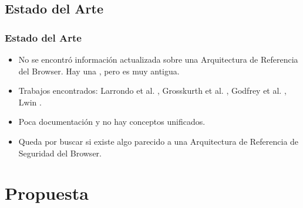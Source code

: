 \documentclass[serif,9pt]{beamer}
\begin{document}
\subsection{Estado del Arte}
\begin{frame}
	\frametitle{Estado del Arte}
	\begin{itemize}
		\item No se encontr\'o informaci\'on actualizada sobre una Arquitectura de Referencia del Browser. Hay una \cite{preprint-grosskurth-browser-archevol}, pero es muy antigua.
		\item Trabajos encontrados: Larrondo et al. \cite{535061}, Grosskurth et al. \cite{2005-grosskurth-browser-refarch,preprint-grosskurth-browser-archevol}, Godfrey et al. \cite{Godfrey2000}, Lwin \cite{Lwin2009}.
		\item Poca documentaci\'on y no hay conceptos unificados.
		\item Queda por buscar si existe algo parecido a una Arquitectura de Referencia de Seguridad del Browser.
	\end{itemize}
\end{frame}


\section{Propuesta}
\end{document}
